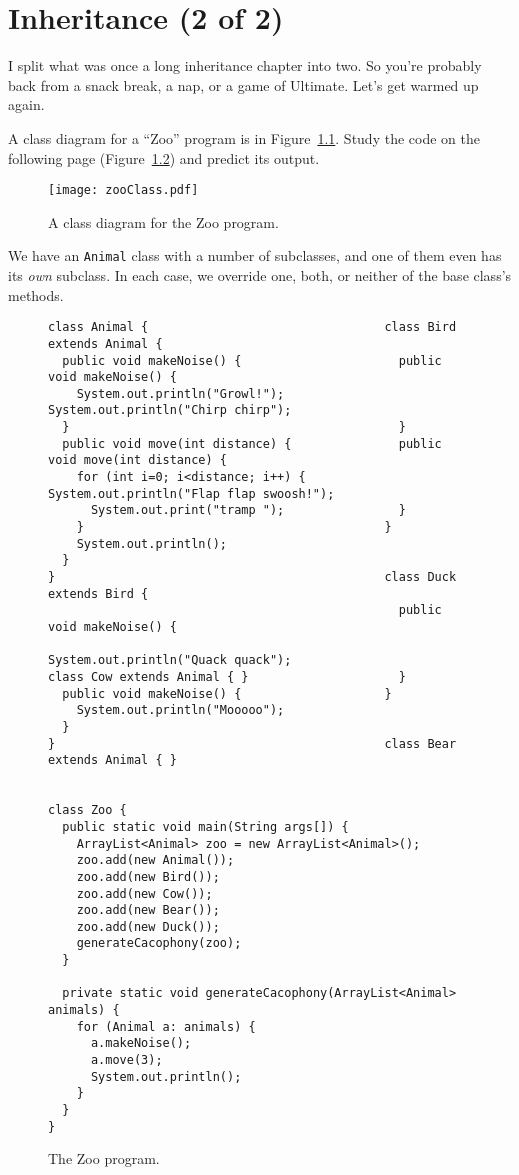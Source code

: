 
\chapter{Inheritance (2 of 2)}

I split what was once a long inheritance chapter into two. So you're probably
back from a snack break, a nap, or a game of Ultimate. Let's get warmed up
again.

A class diagram for a ``Zoo'' program is in Figure~\ref{fig:zooClass}. Study
the code on the following page (Figure~\ref{fig:zooCode}) and predict its
output.

\begin{figure}[ht]
\label{zooExample}
\centering
\texttt{[image: zooClass.pdf]}
\caption{A class diagram for the Zoo program.}
\label{fig:zooClass}
\end{figure}

We have an \texttt{Animal} class with a number of subclasses, and one of them
even has its \textit{own} subclass. In each case, we override one, both, or
neither of the base class's methods.

\begin{figure}
\begin{Verbatim}[fontsize=\scriptsize,samepage=true,frame=single]
class Animal {                                 class Bird extends Animal {
  public void makeNoise() {                      public void makeNoise() {
    System.out.println("Growl!");                  System.out.println("Chirp chirp");
  }                                              }
  public void move(int distance) {               public void move(int distance) {
    for (int i=0; i<distance; i++) {               System.out.println("Flap flap swoosh!");
      System.out.print("tramp ");                }
    }                                          }
    System.out.println();                      
  }
}                                              class Duck extends Bird {
                                                 public void makeNoise() {
                                                   System.out.println("Quack quack");
class Cow extends Animal { }                     }
  public void makeNoise() {                    }
    System.out.println("Mooooo");              
  }
}                                              class Bear extends Animal { }


class Zoo {
  public static void main(String args[]) {
    ArrayList<Animal> zoo = new ArrayList<Animal>();
    zoo.add(new Animal());
    zoo.add(new Bird());
    zoo.add(new Cow());
    zoo.add(new Bear());
    zoo.add(new Duck());
    generateCacophony(zoo);
  }

  private static void generateCacophony(ArrayList<Animal> animals) {
    for (Animal a: animals) {
      a.makeNoise();
      a.move(3);
      System.out.println();
    }
  }
}\end{Verbatim}
\caption{The Zoo program.}
\label{fig:zooCode}
\end{figure}

